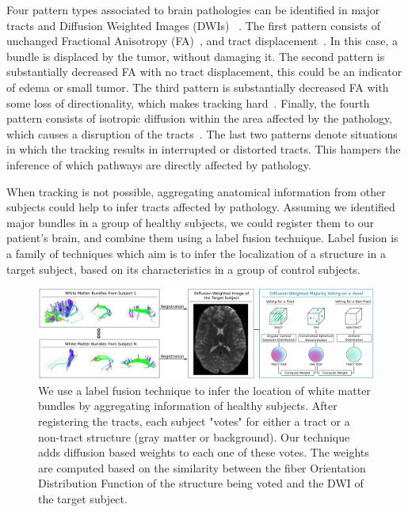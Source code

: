 Four pattern types associated to brain pathologies can be identified in major
tracts and Diffusion Weighted Images (DWIs) ~\cite{Pictorial2004}. The first
pattern consists of unchanged Fractional Anisotropy (FA)~\cite{Basser1996}, and
tract displacement~\cite{Pictorial2004}. In this case, a
bundle is displaced by the tumor, without damaging it. The second pattern
is substantially decreased FA with no tract displacement, this could be
an indicator of edema or small tumor\cite{Schonberg2006, Huisman2009}.
The third pattern is substantially decreased FA with some loss of directionality,
which makes tracking hard~\cite{Schonberg2006, Pictorial2004}. Finally,
the fourth pattern consists of isotropic diffusion within the area affected by
the pathology, which causes a disruption of the tracts~\cite{Pictorial2004}.
The last two patterns denote situations in which the tracking results in
interrupted or distorted tracts. This hampers the inference of which pathways
are directly affected by pathology.

When tracking is not possible, aggregating anatomical information
from other subjects could help to infer tracts affected by pathology.
Assuming we identified major bundles in a group of healthy subjects, we could
register them to our patient's brain, and combine them using a label fusion
technique. Label fusion is a family of techniques which aim is to infer the
localization of a structure in a target subject, based on its characteristics
in a group of control subjects\cite{Asman2013}.

\begin{figure}[t]
    \includegraphics[width=\textwidth]{7.multiatlas/img/diagram.png}
    \caption{We use a label fusion technique to infer the location of white
             matter bundles by aggregating information of healthy subjects.
             After registering the tracts, each subject "votes" for either
             a tract or a non-tract structure (gray matter or background).
             Our technique adds diffusion based weights to each one of these votes.
             The weights are computed based on the similarity between the fiber
             Orientation Distribution Function of the structure being voted
             and the DWI of the target subject.}
    \label{fig:weighted_diffusion}
\end{figure}

